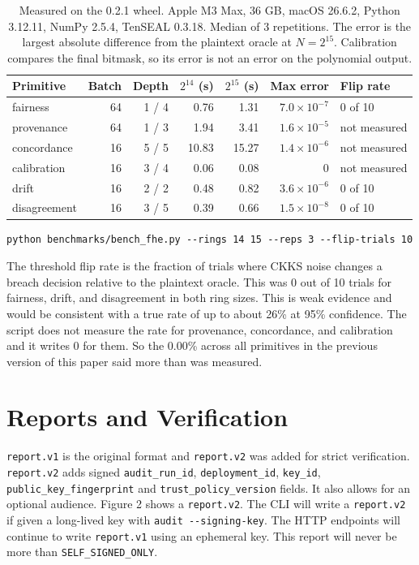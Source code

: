 \documentclass[10pt,a4paper]{article}
\begin{document}
\begin{table}[h]
\small
\caption{Measured on the 0.2.1 wheel. Apple M3 Max, 36 GB, macOS 26.6.2, Python 3.12.11, NumPy 2.5.4, TenSEAL 0.3.18. Median of 3 repetitions. The error is the largest absolute difference from the plaintext oracle at $N=2^{15}$. Calibration compares the final bitmask, so its error is not an error on the polynomial output.}
\begin{tabularx}{\textwidth}{l r r r r r Y}
\toprule
\textbf{Primitive} & \textbf{Batch} & \textbf{Depth} & \textbf{$2^{14}$ (s)} & \textbf{$2^{15}$ (s)} & \textbf{Max error} & \textbf{Flip rate} \\
\midrule
fairness     & 64 & 1 / 4 & 0.76  & 1.31  & $7.0 \times 10^{-7}$ & 0 of 10 \\
provenance   & 64 & 1 / 3 & 1.94  & 3.41  & $1.6 \times 10^{-5}$ & not measured \\
concordance  & 16 & 5 / 5 & 10.83 & 15.27 & $1.4 \times 10^{-6}$ & not measured \\
calibration  & 16 & 3 / 4 & 0.06  & 0.08  & $0$                  & not measured \\
drift        & 16 & 2 / 2 & 0.48  & 0.82  & $3.6 \times 10^{-6}$ & 0 of 10 \\
disagreement & 16 & 3 / 5 & 0.39  & 0.66  & $1.5 \times 10^{-8}$ & 0 of 10 \\
\bottomrule
\end{tabularx}
\end{table}

\begin{lstlisting}
python benchmarks/bench_fhe.py --rings 14 15 --reps 3 --flip-trials 10
\end{lstlisting}

The threshold flip rate is the fraction of trials where CKKS noise changes a breach decision relative to the plaintext oracle. This was 0 out of 10 trials for fairness, drift, and disagreement in both ring sizes. This is weak evidence and would be consistent with a true rate of up to about 26\% at 95\% confidence. The script does not measure the rate for provenance, concordance, and calibration and it writes 0 for them. So the 0.00\% across all primitives in the previous version of this paper said more than was measured.

\section{Reports and Verification}

\texttt{report.v1} is the original format and \texttt{report.v2} was added for strict verification. \texttt{report.v2} adds signed \texttt{audit\_run\_id}, \texttt{deployment\_id}, \texttt{key\_id}, \texttt{public\_key\_fingerprint} and \texttt{trust\_policy\_version} fields. It also allows for an optional audience. Figure 2 shows a \texttt{report.v2}. The CLI will write a \texttt{report.v2} if given a long-lived key with \texttt{audit -{}-signing-key}. The HTTP endpoints will continue to write \texttt{report.v1} using an ephemeral key. This report will never be more than \texttt{SELF\_SIGNED\_ONLY}.
\end{document}
